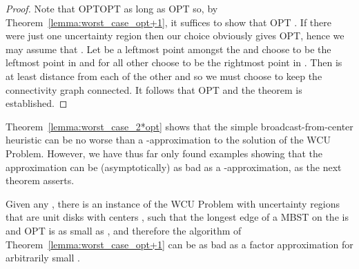 \begin{proof} Note that OPTOPT as long as OPT  so, by Theorem~\ref{lemma:worst_case_opt+1}, it suffices to show that OPT .  If there were just one uncertainty region then our choice obviously gives OPT, hence we may assume that .
Let  be a leftmost point amongst the  and choose  to be the leftmost point in  and for all other   choose  to be the rightmost point in .  Then  is at least distance  from each of the other  and so we must choose  to keep the connectivity graph connected.  It follows that OPT  and the theorem is established. 
\end{proof}

Theorem~\ref{lemma:worst_case_2*opt} shows that the simple broadcast-from-center heuristic can be no worse than a -approximation to the solution of the WCU Problem.  However, we have thus far only found examples showing that the approximation can be (asymptotically) as bad as a -approximation, as the next theorem asserts.

\begin{theorem} \label{lemma:worst_case_lower_bound} Given any , there is an instance of the WCU Problem with uncertainty regions that are unit disks
 with centers ,
such that the longest edge of a MBST on the  is  and OPT is as small as , and therefore the algorithm of Theorem~\ref{lemma:worst_case_opt+1} can be as bad as a factor  approximation for arbitrarily small .
\end{theorem}


